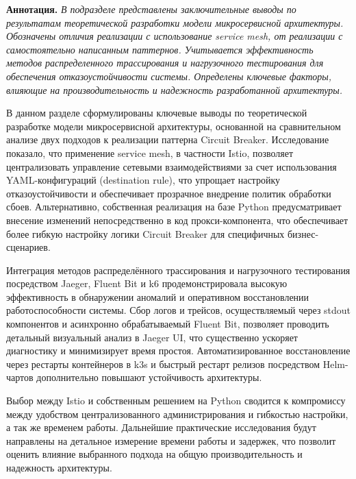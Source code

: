\textbf{Аннотация.} \textit{В подразделе представлены заключительные выводы по результатам теоретической разработки модели микросервисной архитектуры. Обозначены отличия реализации с использование service mesh, от реализации с самостоятельно написанным паттернов. Учитывается эффективность методов распределенного трассирования и нагрузочного тестирования для обеспечения отказоустойчивости системы. Определены ключевые факторы, влияющие на производительность и надежность разработанной архитектуры.}

В данном разделе сформулированы ключевые выводы по теоретической разработке модели микросервисной архитектуры, основанной на сравнительном анализе двух подходов к реализации паттерна Circuit Breaker. Исследование показало, что применение service mesh, в частности Istio, позволяет централизовать управление сетевыми взаимодействиями за счет использования YAML-конфигураций (destination rule), что упрощает настройку отказоустойчивости и обеспечивает прозрачное внедрение политик обработки сбоев. Альтернативно, собственная реализация на базе Python предусматривает внесение изменений непосредственно в код прокси-компонента, что обеспечивает более гибкую настройку логики Circuit Breaker для специфичных бизнес-сценариев.

Интеграция методов распределённого трассирования и нагрузочного тестирования посредством Jaeger, Fluent Bit и k6 продемонстрировала высокую эффективность в обнаружении аномалий и оперативном восстановлении работоспособности системы. Сбор логов и трейсов, осуществляемый через stdout компонентов и асинхронно обрабатываемый Fluent Bit, позволяет проводить детальный визуальный анализ в Jaeger UI, что существенно ускоряет диагностику и минимизирует время простоя. Автоматизированное восстановление через рестарты контейнеров в k3s и быстрый рестарт релизов посредством Helm-чартов дополнительно повышают устойчивость архитектуры.

Выбор между Istio и собственным решением на Python сводится к компромиссу между удобством централизованного администрирования и гибкостью настройки, а так же временем работы. Дальнейшие практические исследования будут направлены на детальное измерение времени работы и задержек, что позволит оценить влияние выбранного подхода на общую производительность и надежность архитектуры.


